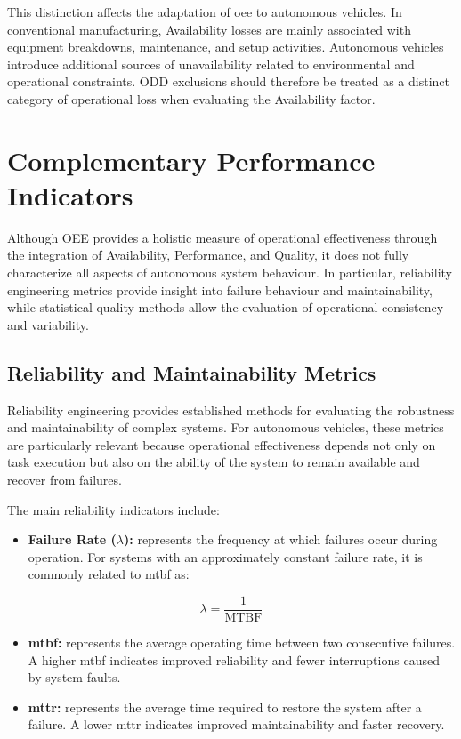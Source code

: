 This distinction affects the adaptation of \gls{oee} to autonomous vehicles. In conventional manufacturing, Availability losses are mainly associated with equipment breakdowns, maintenance, and setup activities. Autonomous vehicles introduce additional sources of unavailability related to environmental and operational constraints. ODD exclusions should therefore be treated as a distinct category of operational loss when evaluating the Availability factor.
\section{Complementary Performance Indicators}
Although OEE provides a holistic measure of operational effectiveness through the integration of Availability, Performance, and Quality, it does not fully characterize all aspects of autonomous system behaviour. In particular, reliability engineering metrics provide insight into failure behaviour and maintainability, while statistical quality methods allow the evaluation of operational consistency and variability.
\subsection{Reliability and Maintainability Metrics}
\label{sec:reliability_state_art}
Reliability engineering provides established methods for evaluating the robustness and maintainability of complex systems. For autonomous vehicles, these metrics are particularly relevant because operational effectiveness depends not only on task execution but also on the ability of the system to remain available and recover from failures.

The main reliability indicators include:

\begin{itemize}
  \item \textbf{Failure Rate ($\lambda$):} represents the frequency at which failures occur during operation. For systems with an approximately constant failure rate, it is commonly related to \gls{mtbf} as:
\end{itemize}

\[
\lambda = \frac{1}{\mathrm{MTBF}}
\]

\begin{itemize}
  \item \textbf{\gls{mtbf}:} represents the average operating time between two consecutive failures. A higher \gls{mtbf} indicates improved reliability and fewer interruptions caused by system faults.
  \item \textbf{\gls{mttr}:} represents the average time required to restore the system after a failure. A lower \gls{mttr} indicates improved maintainability and faster recovery.
\end{itemize}

